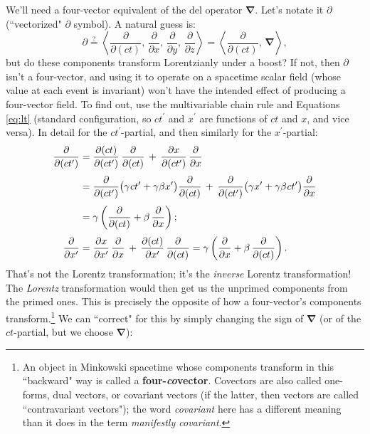 \documentclass[12pt]{article}
\newcommand{\del}{\boldsymbol{\nabla}}
\begin{document}
We'll need a four-vector equivalent of the del operator $\del$. Let's notate it $\partialup$ (``vectorized" $\partial$ symbol). A natural guess is:
\begin{equation*}
\partialup \stackrel{?}{=} \left \langle \dfrac{\partial}{\partial (ct)} , \, \dfrac{\partial}{\partial x}, \, \dfrac{\partial}{\partial y}, \, \dfrac{\partial}{\partial z} \right \rangle = \left \langle \dfrac{\partial}{\partial (ct)} , \, \del \right \rangle ,
\end{equation*}
but do these components transform Lorentzianly under a boost? If not, then $\partialup$ isn't a four-vector, and using it to operate on a spacetime scalar field (whose value at each event is invariant) won't have the intended effect of producing a four-vector field. To find out, use the multivariable chain rule and Equations \ref{eq:lt} (standard configuration, so $ct^\prime$ and $x^\prime$ are functions of $ct$ and $x$, and vice versa). In detail for the $ct^\prime$-partial, and then similarly for the $x^\prime$-partial:
\begin{equation*}
\begin{split}
\dfrac{\partial}{\partial (ct^\prime)} &= \dfrac{\partial (ct)}{\partial (ct^\prime)} \, \dfrac{\partial}{\partial (ct)} \, + \, \dfrac{\partial x}{\partial (ct^\prime)} \, \dfrac{\partial}{\partial x} \\[3pt] &= \dfrac{\partial}{\partial (ct^\prime)} \big( \gamma \mkern1mu ct^\prime + \gamma \beta x^\prime \big) \dfrac{\partial}{\partial (ct)} \, + \, \dfrac{\partial}{\partial (ct^\prime)} \big( \gamma x^\prime + \gamma \beta \mkern1mu ct^\prime \big) \dfrac{\partial}{\partial x} \\[3pt] &= \gamma \left( \dfrac{\partial}{\partial (ct)} + \beta \, \dfrac{\partial}{\partial x} \right) ; \\[3pt]
\dfrac{\partial}{\partial x^\prime} &= \dfrac{\partial x}{\partial x^\prime} \, \dfrac{\partial}{\partial x} \, + \, \dfrac{\partial (ct)}{\partial x^\prime} \, \dfrac{\partial}{\partial (ct)}  = \gamma \left( \dfrac{\partial}{\partial x} + \beta \, \dfrac{\partial}{\partial (ct)}  \right) .
\end{split}
\end{equation*}
That's not the Lorentz transformation; it's the \emph{inverse} Lorentz transformation! The \emph{Lorentz} transformation would then get us the unprimed components from the primed ones. This is precisely the opposite of how a four-vector's components transform.\footnote{\label{fn:cv}An object in Minkowski spacetime whose components transform in this ``backward" way is called a \textbf{four-\emph{co}vector}. Covectors are also called one-forms, dual vectors, or covariant vectors (if the latter, then vectors are called ``contravariant vectors"); the word \emph{covariant} here has a different meaning than it does in the term \emph{manifestly covariant}.} We can ``correct" for this by simply changing the sign of $\del$ (or of the $ct$-partial, but we choose $\del$):
\end{document}

